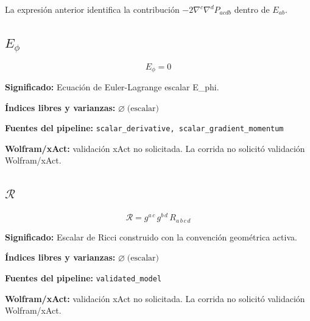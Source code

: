 \documentclass[11pt]{article}
\begin{document}
\par\vspace{0.8\baselineskip}\noindent
\begin{minipage}{\linewidth}
La expresión anterior identifica la contribución $-2\nabla^c\nabla^dP_{acdb}$ dentro de $E_{ab}$.\par
\end{minipage}
\subsection*{$ E_{\phi} $}
\begin{dmath*}[breakdepth={5}]
E_{\phi} = 0
\end{dmath*}
\par\vspace{1.2\baselineskip}\noindent
\begin{minipage}{\linewidth}
\textbf{Significado:} Ecuación de Euler-Lagrange escalar E\_phi.\par
\textbf{Índices libres y varianzas:} $ \varnothing\;\text{(escalar)} $\par
\textbf{Fuentes del pipeline:} \texttt{scalar\_derivative, scalar\_gradient\_momentum}\par
\textbf{Wolfram/xAct:} validación xAct no solicitada. La corrida no solicitó validación Wolfram/xAct.\par
\end{minipage}
\subsection*{$ \mathcal{R} $}
\begin{dmath*}[breakdepth={5}]
\mathcal{R} = g{}^{a\,c}\,g{}^{b\,d}\,R{}_{a\,b\,c\,d}
\end{dmath*}
\par\vspace{1.2\baselineskip}\noindent
\begin{minipage}{\linewidth}
\textbf{Significado:} Escalar de Ricci construido con la convención geométrica activa.\par
\textbf{Índices libres y varianzas:} $ \varnothing\;\text{(escalar)} $\par
\textbf{Fuentes del pipeline:} \texttt{validated\_model}\par
\textbf{Wolfram/xAct:} validación xAct no solicitada. La corrida no solicitó validación Wolfram/xAct.\par
\end{minipage}
\end{document}
